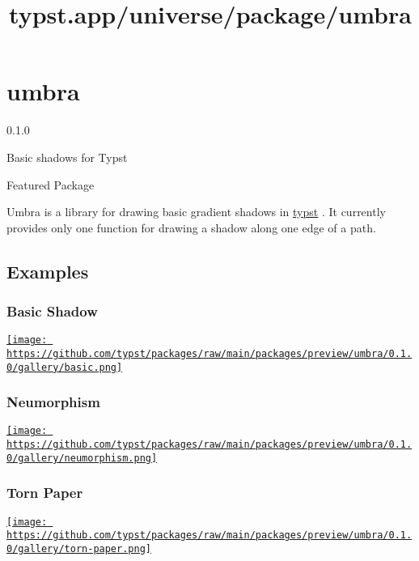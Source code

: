 \title{typst.app/universe/package/umbra}

\label{banner}
\section{umbra}\label{umbra}

{ 0.1.0 }

Basic shadows for Typst

{ } Featured Package

\label{readme}
Umbra is a library for drawing basic gradient shadows in
\href{https://typst.app/}{typst} . It currently provides only one
function for drawing a shadow along one edge of a path.

\subsection{Examples}\label{examples}

\subsubsection{Basic Shadow}\label{basic-shadow}

\href{https://github.com/typst/packages/raw/main/packages/preview/umbra/0.1.0/gallery/basic.typ}{\texttt{[image: https://github.com/typst/packages/raw/main/packages/preview/umbra/0.1.0/gallery/basic.png]}}

\subsubsection{Neumorphism}\label{neumorphism}

\href{https://github.com/typst/packages/raw/main/packages/preview/umbra/0.1.0/gallery/neumorphism.typ}{\texttt{[image: https://github.com/typst/packages/raw/main/packages/preview/umbra/0.1.0/gallery/neumorphism.png]}}

\subsubsection{Torn Paper}\label{torn-paper}

\href{https://github.com/typst/packages/raw/main/packages/preview/umbra/0.1.0/gallery/torn-paper.typ}{\texttt{[image: https://github.com/typst/packages/raw/main/packages/preview/umbra/0.1.0/gallery/torn-paper.png]}}

